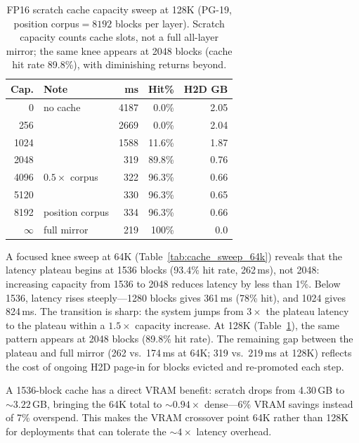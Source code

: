\documentclass[10pt,twocolumn,a4paper]{article}
\theoremstyle{definition}
\theoremstyle{remark}
\begin{document}
\begin{table}[ht]
\centering
\caption{FP16 scratch cache capacity sweep at 128K (PG-19, position corpus${}=8192$ blocks per layer).  Scratch capacity counts cache slots, not a full all-layer mirror; the same knee appears at 2048 blocks (cache hit rate 89.8\%), with diminishing returns beyond.}
\label{tab:cache_sweep_128k}
\scriptsize
\begin{tabular}{rlrrr}
\toprule
\textbf{Cap.} & \textbf{Note} & \textbf{ms} & \textbf{Hit\%} & \textbf{H2D GB} \\
\midrule
0       & no cache       & 4187 & 0.0\%   & 2.05 \\
256     &                & 2669 & 0.0\%   & 2.04 \\
1024    &                & 1588 & 11.6\%  & 1.87 \\
\rowcolor[gray]{0.92}
2048    &                & 319  & 89.8\%  & 0.76 \\
4096    & $0.5\times$ corpus & 322 & 96.3\% & 0.66 \\
5120    &                & 330  & 96.3\%  & 0.65 \\
8192    & position corpus & 334 & 96.3\% & 0.66 \\
\rowcolor[gray]{0.92}
$\infty$ & full mirror  & 219  & 100\%   & 0.0 \\
\bottomrule
\end{tabular}
\end{table}

A focused knee sweep at 64K (Table~\ref{tab:cache_sweep_64k}) reveals that the latency plateau begins at 1536 blocks (93.4\% hit rate, 262\,ms), not 2048: increasing capacity from 1536 to 2048 reduces latency by less than 1\%.  Below 1536, latency rises steeply---1280 blocks gives 361\,ms (78\% hit), and 1024 gives 824\,ms.  The transition is sharp: the system jumps from $3\times$ the plateau latency to the plateau within a $1.5\times$ capacity increase.  At 128K (Table~\ref{tab:cache_sweep_128k}), the same pattern appears at 2048 blocks (89.8\% hit rate).  The remaining gap between the plateau and full mirror (262 vs.\ 174\,ms at 64K; 319 vs.\ 219\,ms at 128K) reflects the cost of ongoing H2D page-in for blocks evicted and re-promoted each step.

A 1536-block cache has a direct VRAM benefit: scratch drops from 4.30\,GB to ${\sim}3.22$\,GB, bringing the 64K total to ${\sim}0.94\times$ dense---6\% VRAM savings instead of 7\% overspend.  This makes the VRAM crossover point 64K rather than 128K for deployments that can tolerate the ${\sim}4\times$ latency overhead.
\end{document}

